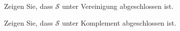 \begin{exercise}[73]

\phantom{}
	Zeigen Sie, dass $\mathscr{S}$ unter Vereinigung abgeschlossen ist.

\end{exercise}


\begin{solution}

\phantom{}

\end{solution}

\begin{exercise}[74]

\phantom{}
	Zeigen Sie, dass $\mathscr{S}$ unter Komplement abgeschlossen ist.

\end{exercise}


\begin{solution}

\phantom{}

\end{solution}
